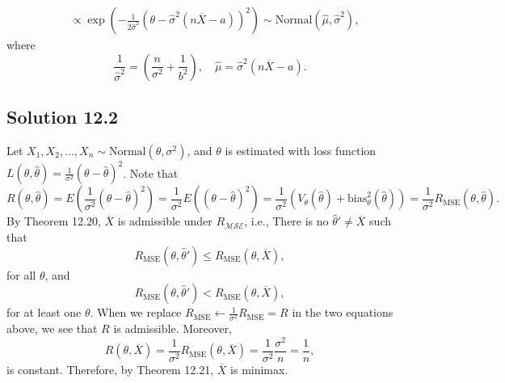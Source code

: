 \begin{itemize}
\begin{equation*}
\begin{split}
                &\propto \exp\left(-\frac{1}{2\hat{\sigma}^2} \left(\theta - \hat{\sigma}^2(n\overline{X} - a)\right)^2\right)
                \sim \mathrm{Normal}(\hat{\mu}, \hat{\sigma}^2),
        \end{split}
    \end{equation*}
    where
    \begin{equation*}
        \frac{1}{\hat{\sigma}^2} = \left(\frac{n}{\sigma^2} + \frac{1}{b^2}\right), \quad \hat{\mu} = \hat{\sigma}^2(n\overline{X} - a).
    \end{equation*}
\end{itemize}


\subsection*{Solution 12.2}

Let $X_1, X_2, ..., X_n \sim \mathrm{Normal}(\theta, \sigma^2)$, and $\theta$ is estimated with loss function $L(\theta, \hat{\theta}) = \frac{1}{\sigma^2}(\theta - \hat{\theta})^2$.
Note that
\begin{equation*}
    R(\theta, \hat{\theta}) = E\left(\frac{1}{\sigma^2}(\theta - \hat{\theta})^2\right)
        = \frac{1}{\sigma^2} E\left((\theta - \hat{\theta})^2\right)
        = \frac{1}{\sigma^2} \left(V_{\theta}(\hat{\theta}) + \mathrm{bias}^2_{\theta}(\hat{\theta})\right)
        = \frac{1}{\sigma^2} R_{\mathrm{MSE}}(\theta, \hat{\theta}).
\end{equation*}
By Theorem 12.20, $\overline{X}$ is admissible under $R_{\mathcal{MSE}}$, i.e., There is no $\hat{\theta}' \neq \overline{X}$ such that
\begin{equation*}
    R_{\mathrm{MSE}}(\theta, \hat{\theta}') \leq R_{\mathrm{MSE}}(\theta, \overline{X}),
\end{equation*}
for all $\theta$, and
\begin{equation*}
    R_{\mathrm{MSE}}(\theta, \hat{\theta}') < R_{\mathrm{MSE}}(\theta, \overline{X}),
\end{equation*}
for at least one $\theta$.
When we replace $R_{\mathrm{MSE}} \leftarrow \frac{1}{\sigma^2} R_{\mathrm{MSE}} = R$ in the two equations above, we see that $R$ is admissible.
Moreover,
\begin{equation*}
    R(\theta, \overline{X}) = \frac{1}{\sigma^2} R_{\mathrm{MSE}}(\theta, \overline{X})
        = \frac{1}{\sigma^2} \frac{\sigma^2}{n}
        = \frac{1}{n},
\end{equation*}
is constant.
Therefore, by Theorem 12.21, $\overline{X}$ is minimax.
